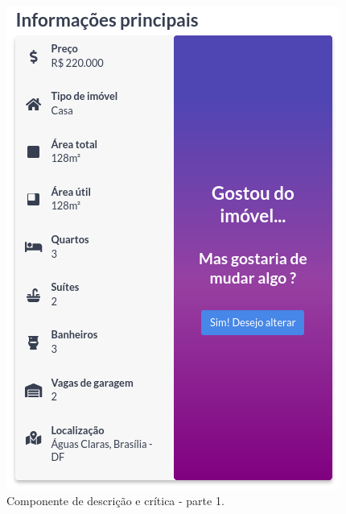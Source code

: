 \begin{figure}[H]
    \centering
    \includegraphics[scale=0.45]{figuras/desenvolvimento/componente_critica.png}
    \caption[Componente de descrição e crítica - parte 1]{Componente de descrição e crítica - parte 1.}
    \label{fig:componente_critica}
\end{figure}

